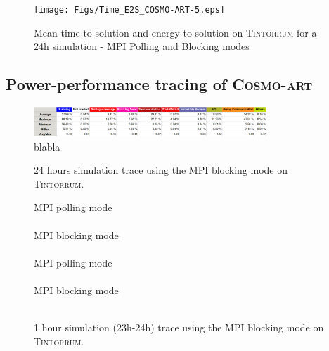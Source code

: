 \begin{figure}[htbf]
  \texttt{[image: Figs/Time\_E2S\_COSMO-ART-5.eps]}
  \caption{Mean time-to-solution and energy-to-solution on
    \textsc{Tintorrum} for a 24h simulation - MPI Polling and Blocking
    modes}
  \label{fig:4}
\end{figure}

\subsection{Power-performance tracing of \textsc{Cosmo-art}}
\label{subsec:4.3}

\begin{figure}[htbf]
  \centering
  \includegraphics[width=0.78\textwidth]{Figs/23_24_blq1_stat1.eps}
  \caption{blabla}
  \label{fig:8}
\end{figure}

\begin{figure}[htbf]
  \centering
  \scalebox{0.5}{}
  \caption{24 hours simulation trace using the MPI blocking mode on
    \textsc{Tintorrum}.}
  \label{fig:9}
\end{figure}

\begin{figure}[htbf]
  \centering
  \scriptsize
  MPI polling mode\\
  \scalebox{0.5}{}\\
  MPI blocking mode\\
  \scalebox{0.5}{}\\
  MPI polling mode\\
  \scalebox{0.5}{}\\
  MPI blocking mode\\
  \scalebox{0.5}{}\\
  \caption{1 hour simulation (23h-24h) trace using the MPI blocking
    mode on \textsc{Tintorrum}.}
  \label{fig:11}
\end{figure}
